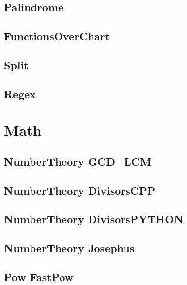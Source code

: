 \subsection{ Palindrome}
\raggedbottom
\hrulefill
\subsection{ FunctionsOverChart}
\raggedbottom
\hrulefill
\subsection{ Split}
\raggedbottom
\hrulefill
\subsection{ Regex}
\raggedbottom
\hrulefill

\section{Math}
\subsection{NumberTheory GCD_LCM}
\raggedbottom
\hrulefill
\subsection{NumberTheory DivisorsCPP}
\raggedbottom
\hrulefill
\subsection{NumberTheory DivisorsPYTHON}
\raggedbottom
\hrulefill
\subsection{NumberTheory Josephus}
\raggedbottom
\hrulefill
\subsection{Pow FastPow}
\raggedbottom
\hrulefill

